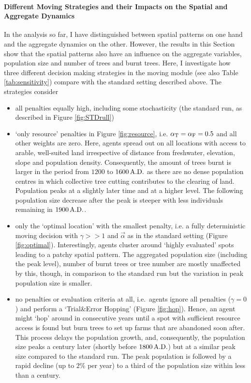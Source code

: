 \paragraph{Different Moving Strategies and their Impacts on the Spatial and Aggregate Dynamics}
In the analysis so far, I have distinguished between spatial patterns on one hand and the aggregate dynamics on the other.
However, the results in this Section show that the spatial patterns also have an influence on the aggregate variables, population size and number of trees and burnt trees.
Here, I investigate how three different decision making strategies in the moving module (see also Table \ref{tab:sensitivity}) compare with the standard setting described above. The strategies consider
\begin{itemize}
	\item  all penalties equally high, including some stochasticity (the standard run, as described in Figure \ref{fig:STDrull}) 
	\item `only resource' penalties in Figure \ref{fig:resource}, i.e. $\alpha_{\rm T}= \alpha_{\rm F} = 0.5$ and all other weights are zero.
	Here, agents spread out on all locations with access to arable, well-suited land irrespective of distance from freshwater, elevation, slope and population density.
	Consequently, the amount of trees burnt is larger in the period from $1200$ to $1600\, {\rm A.D.}$ as there are no dense population centres in which collective tree cutting contributes to the clearing of land. 
	Population peaks at a slightly later time and at a higher level. 
	The following population size decrease after the peak is steeper with less individuals remaining in $1900\, {\rm A.D.}$.
	\item only the `optimal location' with the smallest penalty, i.e. a fully deterministic moving decision with $\gamma>>1$ and $\vec{\alpha}$ as in the standard setting (Figure \ref{fig:optimal}).
	Interestingly, agents cluster around `highly evaluated' spots leading to a patchy spatial pattern. The aggregated population size (including the peak level), number of burnt trees or tree number are mostly unaffected by this, though, in comparison to the standard run but the variation in peak population size is smaller.
	\item no penalties or evaluation criteria at all, i.e.\ agents ignore all penalties ($\gamma = 0$) and perform a `Trial\&Error Hopping' (Figure \ref{fig:hop}).
	Hence, an agent might `hop' around in consecutive years until a spot with sufficient resource access is found but burn trees to set up farms that are abandoned soon after.
	This process delays the population growth, and, consequently, the population size peaks a century later (shortly before $1800\, {\rm A.D.}$) but at a similar peak size compared to the standard run. The peak population is followed by a rapid decline (up to $2\%$ per year) to a third of the population size within less than a century.
\end{itemize}
